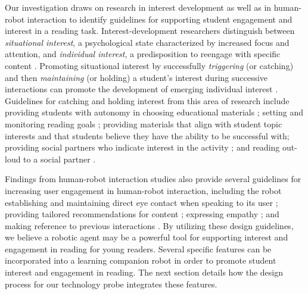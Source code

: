 \documentclass{sigchi}
\begin{document}
Our investigation draws on research in interest development as well as in human-robot interaction to identify guidelines for supporting student engagement and interest in a reading task. Interest-development researchers distinguish between \textit{situational interest}, a psychological state characterized by increased focus and attention, and \textit{individual interest}, a predisposition to reengage with specific content \cite{Hidi:2006}. Promoting situational interest by successfully \textit{triggering} (or catching) and then \textit{maintaining} (or holding) a student's interest during successive interactions can promote the development of emerging individual interest \cite{Hidi:2006, Mitchell:1993}. Guidelines for catching and holding interest from this area of research include providing students with autonomy in choosing educational materials \cite{Jones:2011}; setting and monitoring reading goals \cite{Cabral:2015}; providing materials that align with student topic interests \cite{Ainley:2002} and that students believe they have the ability to be successful with; providing social partners who indicate interest in the activity \cite{Sansone:2005}; and reading out-loud to a social partner \cite{Rasinski:2003}. 

Findings from human-robot interaction studies also provide several guidelines for increasing user engagement in human-robot interaction, including the robot establishing and maintaining direct eye contact when speaking to its user \cite{Mutlu:2011}; providing tailored recommendations for content \cite{Lim:2013}; expressing empathy \cite{Leite:2012}; and making reference to previous interactions \cite{Leite:2009}. By utilizing these design guidelines, we believe a robotic agent may be a powerful tool for supporting interest and engagement in reading for young readers. Several specific features can be incorporated into a learning companion robot in order to promote student interest and engagement in reading. The next section details how the design process for our technology probe integrates these features.

\end{document}
